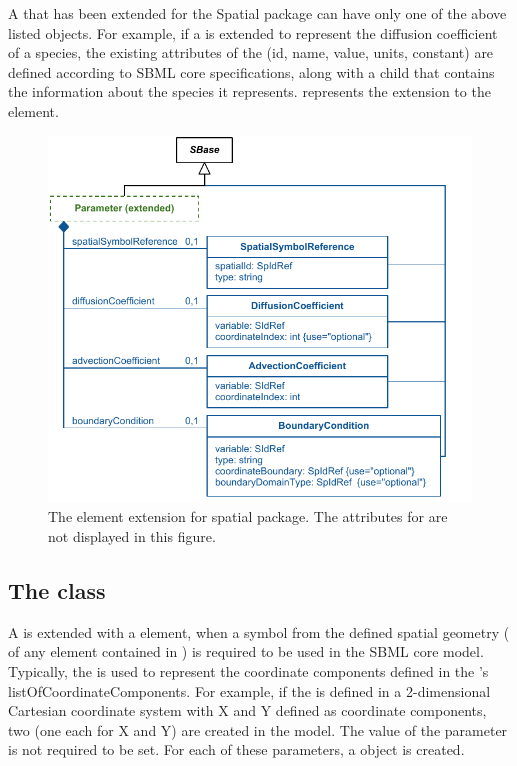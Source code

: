 A \Parameter that has been extended for the Spatial package can have only one of the above listed objects.  For example, if a \Parameter is extended to represent the diffusion coefficient of a species, the existing attributes of the \Parameter (id, name, value, units, constant) are defined according to SBML core specifications, along with a \DiffusionCoefficient child that contains the information about the species it represents.  represents the extension to the \Parameter element.

\begin{figure}[ht]
  \includegraphics{figs/extended-parameter-uml}
  \caption{The \Parameter element extension for spatial package. The \sbmlthreecore attributes for \Parameter are not displayed in this figure.}
  \label{parameter-uml}
\end{figure}



\subsection{The  class}
\label{SpatialSymbolReference-class}
A \Parameter is extended with a \SpatialSymbolReference element, when a symbol from the defined spatial geometry ( of any element contained in \Geometry) is required to be used in the SBML core model. Typically, the \SpatialSymbolReference is used to represent the coordinate components defined in the \Geometry's listOfCoordinateComponents.  For example, if the \Geometry is defined in a 2-dimensional Cartesian coordinate system with X and Y defined as coordinate components, two \Parameters (one each for \CoordinateComponents X and Y) are created in the model. The value of the parameter is not required to be set. For each of these parameters, a \SpatialSymbolReference object is created.

